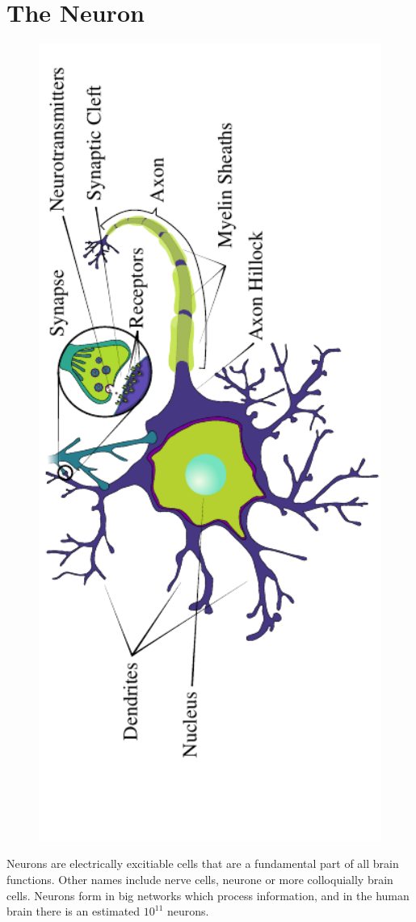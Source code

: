 \documentclass[altfont, fleqn]{uiophd}
\begin{document}
\section{The Neuron}
\begin{figure}[h]
    \centering
    \includegraphics[angle=-90,width=1.0\textwidth]{images/2_1/neuron_structure.pdf}
    \caption{}
    \label{fig:2_1_neuron}
\end{figure}
\noindent
{Neurons} 
are electrically excitiable cells
that are a fundamental part of all brain functions.
Other names include {nerve cells}, {neurone} or more 
colloquially {brain cells}.
Neurons form in big networks 
which process information,
and in the human brain there is an estimated $10^{11}$ neurons.
\end{document}
